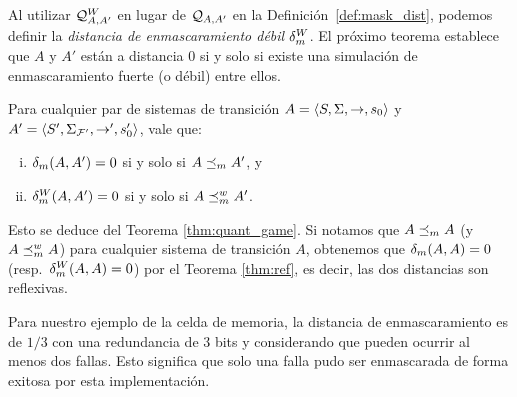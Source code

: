 Al utilizar $\mathcal{Q}^W_{A,A'}$ en lugar de $\mathcal{Q}_{A, A'}$ en la 
Definición~\ref{def:mask_dist}, podemos definir la \emph{distancia de enmascaramiento débil} $\delta_{m}^W$. El próximo teorema establece que $A$ y
$A'$ están a distancia $0$ si y solo si existe una simulación de enmascaramiento fuerte (o débil) entre ellos.

\begin{theorem}\label{thm:ref}
  Para cualquier par de sistemas de transición $A = \langle S, \Sigma, \rightarrow, s_0 \rangle$ y $A' = \langle S', \Sigma_{\mathcal{F'}}, \rightarrow', s'_0 \rangle$, vale que:
  \begin{enumerate}[(i)]
  \item  $\delta_{m}(A,A') = 0$ si y solo si $A \preceq_{m} A'$, y
   \item $\delta_{m}^W(A,A') = 0$ si y solo si $A \preceq^w_{m} A' $.
  \end{enumerate}
\end{theorem}
%
Esto se deduce del Teorema \ref{thm:quant_game}.
Si notamos que $A \preceq_{m} A$ (y $A \preceq^w_{m} A$) para cualquier sistema de transición $A$, obtenemos que $\delta_{m}(A,A)=0$ (resp.\ $\delta_{m}^W(A,A)=0$) por el Teorema \ref{thm:ref}, es decir, 
las dos distancias son reflexivas.

Para nuestro ejemplo de la celda de memoria, la distancia de enmascaramiento es de $1/3$ 
con una redundancia de $3$ bits y considerando que pueden ocurrir al menos dos fallas. 
Esto significa que solo una falla pudo ser enmascarada de forma exitosa por esta implementación. \\

